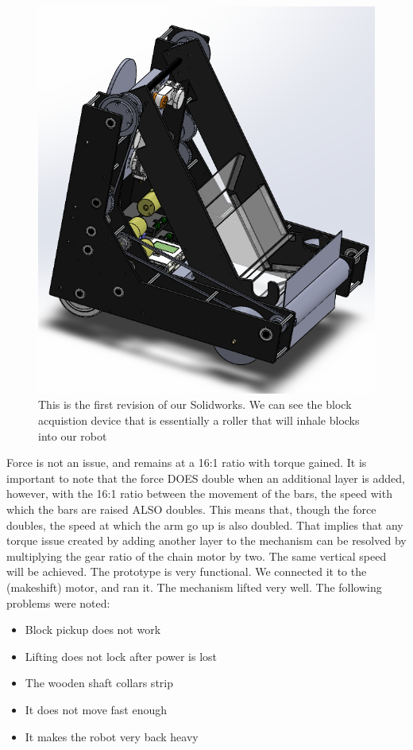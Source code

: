 \begin{center}
\begin{figure}[H]
\includegraphics[scale=0.5]{images/RobotV1.png}
\caption{This is the first revision of our Solidworks. We can see the block acquistion device that is essentially a roller that will inhale blocks into our robot}
\end{figure}
\end{center}

Force is not an issue, and remains at a 16:1 ratio with torque gained. It is important to note that the force DOES double when an additional layer is added, however, with the 16:1 ratio between the movement of the bars, the speed with which the bars are raised ALSO doubles. This means that, though the force doubles, the speed at which the arm go up is also doubled. That implies that any torque issue created by adding another layer to the mechanism can be resolved by multiplying the gear ratio of the chain motor by two. The same vertical speed will be achieved.
The prototype is very functional. We connected it to the (makeshift) motor, and ran it. The mechanism lifted very well. The following problems were noted:
\begin{itemize}
\item Block pickup does not work
\item Lifting does not lock after power is lost
\item The wooden shaft collars strip
\item It does not move fast enough
\item It makes the robot very back heavy
\end{itemize}

